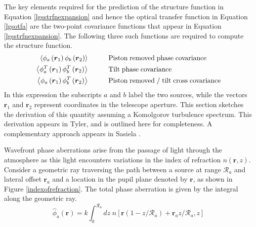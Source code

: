 The key elements required for the prediction of the structure function
in Equation \ref{lgsstrfnexpansion} and hence the optical transfer
function in Equation \ref{lgsotfa} are the two-point covariance
functions that appear in Equation \ref{lgsstrfnexpansion}.  The
following three such functions are required to compute the structure
function.
\begin{equation}\label{tpcf}
\begin{aligned}
\left\langle \phi_{a}\left(\boldsymbol{r}_{1}\right) \phi_{b}\left(\boldsymbol{r}_{2}\right) \right\rangle &\quad\quad\quad {\rm Piston\;removed\;phase\;covariance} \\
\left\langle \phi^{T}_{a}\left(\boldsymbol{r}_{1}\right) \phi^{T}_{b}\left(\boldsymbol{r}_{2}\right) \right\rangle &\quad\quad\quad {\rm Tilt\;phase\;covariance} \\
\left\langle \phi_{a}\left(\boldsymbol{r}_{1}\right) \phi^{T}_{b}\left(\boldsymbol{r}_{2}\right) \right\rangle &\quad\quad\quad {\rm Piston\;removed\;/\;tilt\;cross\;covariance} \\
\end{aligned}
\end{equation}
In this expression the subscripts $a$ and $b$ label the two sources,
while the vectors $\boldsymbol{r}_{1}$ and $\boldsymbol{r}_{2}$
represent coordinates in the telescope aperture.  This section
sketches the derivation of this quantity assuming a Komolgorov
turbulence spectrum.  This derivation appears in
Tyler\cite{1994JOSAA..11..409T}, and is outlined here for
completeness.  A complementary approach appears in Sasiela
\cite{sasiela2007electromagnetic}.

Wavefront phase aberrations arise from the passage of light through
the atmosphere as this light encounters variations in the index of
refraction $n\left(\boldsymbol{r},z\right)$.  Consider a geometric ray
traversing the path between a source at range $\mathcal{R}_{a}$ and
lateral offset $\boldsymbol{r}_{a}$ and a location in the pupil plane
denoted by $\boldsymbol{r}$, as shown in Figure
\ref{indexofrefraction}.  The total phase aberration is given by the integral
along the geometric ray.
\begin{equation}\label{totalphase_n}
\hat{\phi}_{a}\left(\boldsymbol{r}\right) = k \int_{0}^{\mathcal{R}_{a}} dz \; 
n\left[\boldsymbol{r}\left(1-z/\mathcal{R}_{a}\right) + \boldsymbol{r}_{a} z/\mathcal{R}_{a}, z\right]
\end{equation}




